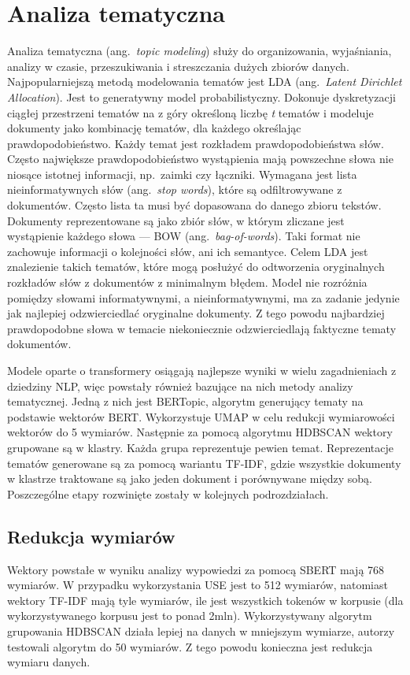 
\chapter{Analiza tematyczna}
	Analiza tematyczna (ang.\ \emph{topic modeling}) służy do organizowania, wyjaśniania, analizy w czasie, przeszukiwania i streszczania dużych zbiorów danych.
	Najpopularniejszą metodą modelowania tematów jest LDA (ang.\ \emph{Latent Dirichlet Allocation})\cite{LDA}.
	Jest to generatywny model probabilistyczny.
	Dokonuje dyskretyzacji ciągłej przestrzeni tematów na z góry określoną liczbę \emph{t} tematów
		i modeluje dokumenty jako kombinację tematów, dla każdego określając prawdopodobieństwo.
	Każdy temat jest rozkładem prawdopodobieństwa słów.
	Często największe prawdopodobieństwo wystąpienia mają powszechne słowa nie niosące istotnej informacji, np.\ zaimki czy łączniki.
	Wymagana jest lista nieinformatywnych słów (ang.\ \emph{stop words}), które są odfiltrowywane z dokumentów.
	Często lista ta musi być dopasowana do danego zbioru tekstów.
	Dokumenty reprezentowane są jako zbiór słów, w którym zliczane jest wystąpienie każdego słowa --- BOW (ang.\ \emph{bag-of-words}).
	Taki format nie zachowuje informacji o kolejności słów, ani ich semantyce.
	Celem LDA jest znalezienie takich tematów, które mogą posłużyć do odtworzenia oryginalnych rozkładów słów z dokumentów z minimalnym błędem.
	Model nie rozróżnia pomiędzy słowami informatywnymi, a nieinformatywnymi, ma za zadanie jedynie jak najlepiej odzwierciedlać oryginalne dokumenty.
	Z tego powodu najbardziej prawdopodobne słowa w temacie niekoniecznie odzwierciedlają faktyczne tematy dokumentów.

	Modele oparte o transformery osiągają najlepsze wyniki w wielu zagadnieniach z dziedziny NLP,
		więc powstały również bazujące na nich metody analizy tematycznej.
	Jedną z nich jest BERTopic\cite{BERTopic}, algorytm generujący tematy na podstawie wektorów BERT\@.
	Wykorzystuje UMAP\cite{UMAP} w celu redukcji wymiarowości wektorów do 5 wymiarów.
	Następnie za pomocą algorytmu HDBSCAN\cite{HDBSCAN} wektory grupowane są w klastry.
	Każda grupa reprezentuje pewien temat.
	Reprezentacje tematów generowane są za pomocą wariantu TF-IDF\@,
		gdzie wszystkie dokumenty w klastrze traktowane są jako jeden dokument i porównywane między sobą.
	Poszczególne etapy rozwinięte zostały w kolejnych podrozdziałach.

\section{Redukcja wymiarów}
	Wektory powstałe w wyniku analizy wypowiedzi za pomocą SBERT mają 768 wymiarów.
	W przypadku wykorzystania USE jest to 512 wymiarów, natomiast wektory TF-IDF mają tyle wymiarów,
		ile jest wszystkich tokenów w korpusie (dla wykorzystywanego korpusu jest to ponad 2mln).
	Wykorzystywany algorytm grupowania HDBSCAN działa lepiej na danych w mniejszym wymiarze,
		autorzy testowali algorytm do 50 wymiarów\cite{HDBSCAN}.
	Z tego powodu konieczna jest redukcja wymiaru danych.
	
